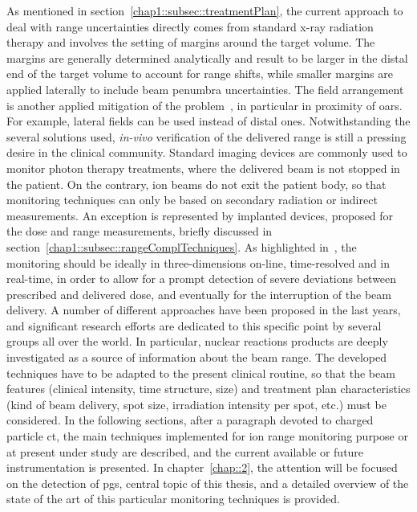 As mentioned in section~\ref{chap1::subsec::treatmentPlan}, the current approach to deal with range uncertainties directly comes from standard x-ray radiation therapy and involves the setting of margins around the target volume. The margins are generally determined analytically and result to be larger in the distal end of the target volume to account for range shifts, while smaller margins are applied laterally to include beam penumbra uncertainties. The field arrangement is another applied mitigation of the problem~\parencite{Lomax2001}, in particular in proximity of \glspl{oar}. For example, lateral fields can be used instead of distal ones. 
Notwithstanding the several solutions used, \textit{in-vivo} verification of the delivered range is still a pressing desire in the clinical community. Standard imaging devices are commonly used to monitor photon therapy treatments, where the delivered beam is not stopped in the patient. On the contrary, ion beams do not exit the patient body, so that monitoring techniques can only be based on secondary radiation or indirect measurements. An exception is represented by implanted devices, proposed for the dose and range measurements, briefly discussed in section~\ref{chap1::subsec::rangeComplTechniques}.
As highlighted in~\cite{Parodi2015}, the monitoring should be ideally in three-dimensions on-line, time-resolved and in real-time, in order to allow for a prompt detection of severe deviations between prescribed and delivered dose, and eventually for the interruption of the beam delivery. A number of different approaches have been proposed in the last years, and significant research efforts are dedicated to this specific point by several groups all over the world. In particular, nuclear reactions products are deeply investigated as a source of information about the beam range. The developed techniques have to be adapted to the present clinical routine, so that the beam features (clinical intensity, time structure, size) and treatment plan characteristics (kind of beam delivery, spot size, irradiation intensity per spot, etc.) must be considered. In the following sections, after a paragraph devoted to charged particle \gls{ct}, the main techniques implemented for ion range monitoring purpose or at present under study are described, and the current available or future instrumentation is presented. In chapter~\ref{chap::2}, the attention will be focused on the detection of \glspl{pg}, central topic of this thesis, and a detailed overview of the state of the art of this particular monitoring techniques is provided.                


